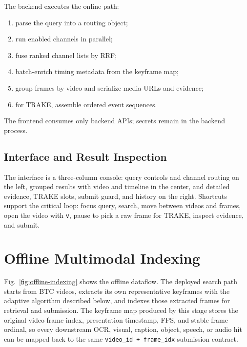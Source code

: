 \documentclass[conference]{IEEEtran}
\newcommand{\rrf}{RRF}
\newcommand{\submitpair}{\texttt{video\_id + frame\_idx}}
\begin{document}
The backend executes the online path:
\begin{enumerate}
  \item parse the query into a routing object;
  \item run enabled channels in parallel;
  \item fuse ranked channel lists by \rrf{};
  \item batch-enrich timing metadata from the keyframe map;
  \item group frames by video and serialize media URLs and evidence;
  \item for TRAKE, assemble ordered event sequences.
\end{enumerate}
The frontend consumes only backend APIs; secrets remain in the backend process.

\subsection{Interface and Result Inspection}

The interface is a three-column console: query controls and channel routing on
the left, grouped results with video and timeline in the center, and detailed
evidence, TRAKE slots, submit guard, and history on the right. Shortcuts support
the critical loop: focus query, search, move between videos and frames, open the
video with \texttt{v}, pause to pick a raw frame for TRAKE, inspect evidence, and
submit.

\section{Offline Multimodal Indexing}

Fig.~\ref{fig:offline-indexing} shows the offline dataflow. The deployed search
path starts from BTC videos, extracts its own representative keyframes with the
adaptive algorithm described below, and indexes those extracted frames for
retrieval and submission. The keyframe map produced by this stage stores the
original video frame index, presentation timestamp, FPS, and stable frame
ordinal, so every downstream OCR, visual, caption, object, speech, or audio hit
can be mapped back to the same \submitpair{} submission contract.
\end{document}
